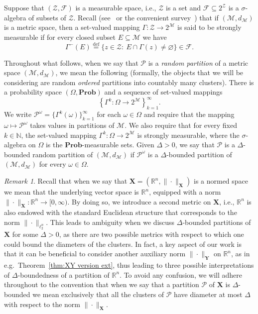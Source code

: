 \documentclass[11pt,reqno]{amsart}
\newcommand{\X}{\mathbf X}
\newcommand{\Y}{\mathbf Y}
\newcommand{\R}{\mathbb R}
\theoremstyle{remark}
\newtheorem{remark}[theorem]{Remark}
\newcommand{\MM}{\mathcal{M}}
\renewcommand{\subset}{\subseteq}
\newcommand{\N}{\mathbb N}
\newcommand{\eqdef}{\stackrel{\mathrm{def}}{=}}
\renewcommand{\Pr}{\mathbf{Prob}}
\renewcommand{\emptyset}{\varnothing}
\renewcommand{\1}{\mathbf 1}
\newcommand{\Part}{\mathscr{P}}
\newcommand{\ZZ}{\mathcal{Z}}
\newcommand{\cF}{\mathscr{F}}
\begin{document}
Suppose that $(\ZZ,\cF)$ is a measurable space, i.e., $\ZZ$ is a set and $\cF\subset 2^\ZZ$ is a $\sigma$-algebra of subsets of $\ZZ$. Recall (see~\cite{Jac68} or the convenient survey~\cite{Wag77}) that if $(\MM,d_\MM)$ is a metric space, then a set-valued mapping $\Gamma:\ZZ\to 2^\MM$ is said to be strongly measurable if for every closed subset $E\subset \MM$ we have
\begin{equation}\label{eq:def measurability}
\Gamma^{-}(E)\eqdef \big\{z\in \ZZ:\ E\cap \Gamma(z)\neq \emptyset\big\}\in \cF.
\end{equation}

Throughout what follows, when we say that $\Part$ is a  {\em random partition}  of a metric space $(\MM,d_\MM)$, we mean the following (formally, the objects that  we will be considering  are random {\em ordered} partitions into countably many clusters). There is  a probability space $(\Omega,\Pr)$  and a sequence of set-valued mappings $$\left\{\Gamma^k:\Omega\to 2^\MM\right\}_{k=1}^\infty.$$ We write $\Part^\omega=\{\Gamma^k(\omega)\}_{k=1}^\infty$ for each $\omega\in \Omega$ and require that  the mapping $\omega\mapsto \Part^\omega$ takes values in partitions of $\MM$. We also require that for every fixed $k\in \N$, the set-valued mapping $\Gamma^k:\Omega\to 2^\MM$ is strongly measurable, where the  $\sigma$-algebra on $\Omega$ is the $\Pr$-measurable sets. Given $\Delta>0$, we say that $\Part$ is a $\Delta$-bounded random partition of $(\MM,d_\MM)$ if $\Part^\omega$ is a $\Delta$-bounded partition of $(\MM,d_\MM)$ for every $\omega\in \Omega$.


\begin{remark}\label{rem:boundedness convention}Recall that when we say that $\X=(\R^n,\|\cdot\|_{\X})$ is a normed space we mean that the underlying vector space is $\R^n$, equipped with a norm $\|\cdot\|_{\X}:\R^n\to [0,\infty)$. By doing so, we introduce a second metric on $\X$, i.e., $\R^n$  is  also endowed with the standard Euclidean structure that corresponds to the norm $\|\cdot\|_{\ell_2^n}$. This leads to ambiguity when we discuss $\Delta$-bounded partitions of $\X$ for some $\Delta>0$, as there are two possible metrics with respect to which one could bound the diameters of the clusters. In fact, a key aspect of our work is that  it can be beneficial to consider another auxiliary norm $\|\cdot\|_{\Y}$ on $\R^n$, as in e.g.~Theorem~\ref{thm:XY version ext}, thus leading to three possible interpretations of $\Delta$-boundedness of a partition of $\R^n$. To avoid any confusion, we will adhere throughout to the convention that when we say that a partition $\Part$ of $\X$ is $\Delta$-bounded we mean exclusively that all the clusters of $\Part$ have diameter at most $\Delta$ with respect to the norm $\|\cdot\|_{\X}$.
\end{remark}
\end{document}

